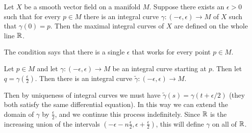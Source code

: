 \documentclass[11pt, english]{article}
\begin{document}
\begin{exc}
Let $X$ be a smooth vector field on a manifold $M$. Suppose there exists an $\epsilon > 0$ such that for every $p \in M$ there is an integral curve $\gamma:(-\epsilon, \epsilon) \to M$ of $X$ such that $\gamma(0)=p$. Then the maximal integral curves of $X$ are defined on the whole line $\mathbb{R}$.
\end{exc}

\begin{sol}
The condition says that there is a single $\epsilon$ that works for every point $p \in M$.

Let $p \in M$ and let $\gamma:(-\epsilon,\epsilon) \to M$ be an integral curve starting at $p$. Then let $q=\gamma(\frac \epsilon 2)$. Then there is an integral curve $\tilde \gamma:(-\epsilon, \epsilon) \to M$. 

Then by uniqueness of integral curves we must have $\tilde \gamma(s)=\gamma(t+\epsilon/2)$ (they both satisfy the same differential equation). In this way we can extend the domain of $\gamma$ by $\frac \epsilon 2$, and we continue this process indefinitely. Since $\mathbb{R}$ is the increasing union of the intervals $(-\epsilon-n \frac \epsilon 2, \epsilon + \frac \epsilon 2)$, this will define $\gamma$ on all of $\mathbb{R}$.
\end{sol}
\end{document}
